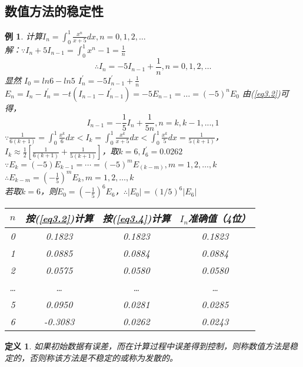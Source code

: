 \documentclass[a4paper]{article}
\newtheorem{definition}{定义}[section]
\newtheorem{example}{例}[section]
\begin{document}
\subsection{数值方法的稳定性}
\begin{example}
计算$I_n=\int^{1}_{0}\frac{x^n}{x+5}dx, n=0,1,2,\dots$ \\
解：$\because I_n + 5 I_{n-1} = \int^1_0x^n-1=\frac{1}{n}$ \\
\begin{equation}
\label{eq3.2}
\therefore I_n = -5I_{n-1} + \frac{1}{n}, n=0, 1, 2, \dots 
\end{equation}
显然 $I_0=ln6-ln5$ \quad $I^{'}_n=-5I_{n-1}^{'}+\frac{1}{n}$ \\
$E_n = I_n - I^{'}_n = -t(I_{n-1}-I_{n-1}^{'}) = -5 E_{n-1} = \dots = (-5)^nE_0$
由(\ref{eq3.2})可得，
\begin{equation}
\label{eq3.4}
I_{n-1}=-\frac{1}{5}I_n + \frac{1}{5n}, n=k, k-1, ..., 1
\end{equation}
$\because \frac{1}{6(k+1)}=\int^1_0\frac{x^k}{6}dx<I_k=\int^1_0\frac{x^k}{x+5}dx<\int^1_0\frac{x^k}{5}dx=\frac{1}{5(k+1)}$，
$I_k \approx \frac{1}{2}[\frac{1}{6(k+1)} + \frac{1}{5(k+1)}]$，取$k=6, I^{'}_6=0.0262$ \\
$\because E_k = (-5)E_{k-1}=\cdots = (-5)^mE_(k-m), m=1,2, \dots, k$ \\
$\therefore E_{k-m}=(-\frac{1}{5})^mE_k, m=1, 2, \dots, k$ \\
若取$k=6$，则$E_0=(-\frac{1}{5})^6E_6$，$\therefore |E_0|=(1/5)^6|E_6|$

\begin{table}[htb]
\centering
\begin{tabular}{c c c c}
 \toprule[1.5pt]
 $n$ & 按(\ref{eq3.2})计算 & 按(\ref{eq3.4})计算& $I_n$准确值（4位）\\
 \midrule[0.8pt]
 0 & 0.1823 & 0.1823 & 0.1823 \\
 1 & 0.0885 & 0.0884 & 0.0884 \\
 2 & 0.0575 & 0.0580 & 0.0580 \\
 \dots & \dots & \dots & \dots \\
 5 & 0.0950 & 0.0281 & 0.0285 \\
 6 & -0.3083 & 0.0262 & 0.0243\\ 
 \bottomrule[1.5pt]
\end{tabular}
\end{table}

\end{example}

\begin{definition}
如果初始数据有误差，而在计算过程中误差得到控制，则称数值方法是稳定的，否则称该方法是不稳定的或称为发散的。
\end{definition}
\end{document}
